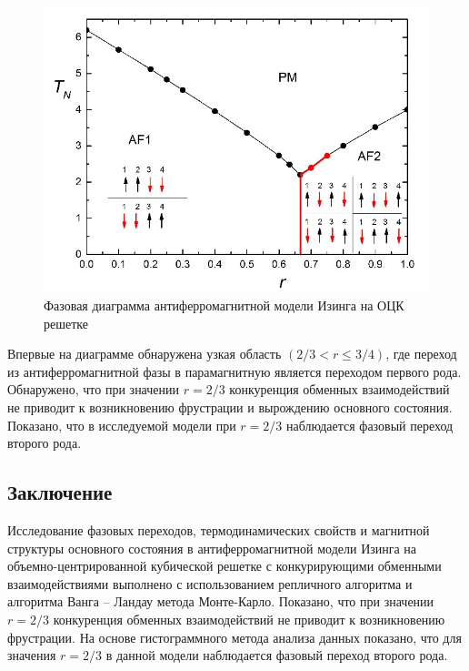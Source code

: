 \begin{figure}[H]
	\centering
	\includegraphics[width=0.5\linewidth]{content/sections/images/phys1-1}
	\caption{Фазовая диаграмма антиферромагнитной модели Изинга на ОЦК решетке}
	\label{phys1-pic-1}
\end{figure}

Впервые на диаграмме обнаружена узкая область $(2/3 < r \leq 3/4)$, где переход из антиферромагнитной фазы в парамагнитную является переходом первого рода. Обнаружено, что при значении $r=2/3$ конкуренция обменных взаимодействий не приводит к возникновению фрустрации и вырождению основного состояния. Показано, что в исследуемой модели при $r = 2/3$ наблюдается фазовый переход второго рода.






\subsection{Заключение}



Исследование фазовых переходов, термодинамических свойств и магнитной структуры основного состояния в антиферромагнитной модели Изинга на объемно-центрированной кубической решетке с конкурирующими обменными взаимодействиями выполнено с использованием репличного алгоритма и алгоритма Ванга -- Ландау метода Монте-Карло. Показано, что при значении $r=2/3$ конкуренция обменных взаимодействий не приводит к возникновению фрустрации. На основе гистограммного метода анализа данных показано, что для значения $r=2/3$ в данной модели наблюдается фазовый переход второго рода.


